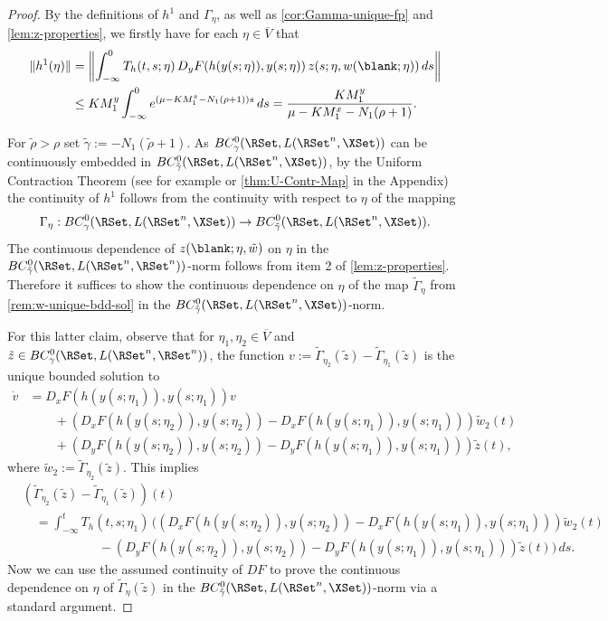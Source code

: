 \documentclass[a4paper]{siamart190516}
\begin{document}
 \begin{proof}
 By the definitions of $h^1$ and $\Gamma_{\eta}$, as well as
 \cref{cor:Gamma-unique-fp} and \cref{lem:z-properties}, we firstly have for each $\eta \in \overline{V}$ that
 \begin{align*}
 \| h^1(\eta) \| &= \left\| \int^0_{-\infty} T_h(t,s; \eta) \, D_yF(h(y(s;\eta)),y(s;\eta)) \, z(s; \eta, w(\blank; \eta)) \, ds \right\| \\
  &\leq K M^y_1 \int_{-\infty}^0 e^{(\mu-K M^x_1-N_1(\rho+1))s} \, ds =  \frac{K M^y_1}{\mu-K M^x_1-N_1(\rho+1)}.
 \end{align*}
 
For $\tilde{\rho} > \rho$ set $\tilde{\gamma} := -N_1(\tilde{\rho} + 1)$. As
$BC^0_{\gamma}(\RSet, L(\RSet^n,\XSet))$ can be continuously embedded in
$BC^0_{\tilde{\gamma}}(\RSet, L(\RSet^n,\XSet))$, by the Uniform Contraction Theorem
(see for example \cite{VaVG87} or \cref{thm:U-Contr-Map} in the Appendix) the continuity of $h^1$ follows from the continuity with respect to $\eta$ of the mapping
\[
\Gamma_{\eta}: BC^0_{\gamma}(\RSet, L(\RSet^n,\XSet)) \rightarrow BC^0_{\tilde{\gamma}}(\RSet, L(\RSet^n,\XSet)).
\]
The continuous dependence of $z(\blank; \eta, \tilde{w})$ on $\eta$ in the
$BC^0_{\tilde{\gamma}}(\RSet, L(\RSet^n,\RSet^n))$-norm follows from item 2 of
\cref{lem:z-properties}. Therefore it suffices to show the continuous dependence on
$\eta$ of the map $\tilde{\Gamma}_{\eta}$ from \cref{rem:w-unique-bdd-sol} in the $BC^0_{\tilde{\gamma}}(\RSet, L(\RSet^n,\XSet))$-norm. 

For this latter claim, observe that for $\eta_1, \eta_2 \in \overline{V}$ and $\tilde{z} \in BC_{\gamma}^{0}(\RSet, L(\RSet^n,\RSet^n))$, the function $v := \tilde{\Gamma}_{\eta_2} (\tilde{z}) - \tilde{\Gamma}_{\eta_1} (\tilde{z})$ is the unique bounded solution to
\begin{align*}
\dot{v} &= D_x F(h(y(s;\eta_1)),y(s;\eta_1)) v  \\
&\qquad +   \left( D_x F(h(y(s;\eta_2)),y(s;\eta_2)) - D_x F(h(y(s;\eta_1)),y(s;\eta_1)) \right) \tilde{w}_2(t) \\
&\qquad + \left( D_y F(h(y(s;\eta_2)),y(s;\eta_2)) - D_y F(h(y(s;\eta_1)),y(s;\eta_1)) \right) \tilde{z}(t),
\end{align*}
where $\tilde{w}_2 := \tilde{\Gamma}_{\eta_2}(\tilde{z})$. This implies
\begin{align*}
&\left(\tilde{\Gamma}_{\eta_2} (\tilde{z}) - \tilde{\Gamma}_{\eta_1} (\tilde{z}) \right)(t) \\
&\quad = \int^t_{-\infty} T_h(t,s;\eta_1) \, \Big(  \left( D_x F(h(y(s;\eta_2)),y(s;\eta_2)) - D_x F(h(y(s;\eta_1)),y(s;\eta_1)) \right) \tilde{w}_2(t) \\
&\qquad \qquad \qquad - \left( D_y F(h(y(s;\eta_2)),y(s;\eta_2)) - D_y F(h(y(s;\eta_1)),y(s;\eta_1)) \right) \tilde{z}(t) \Big)  \, ds.
\end{align*}
Now we can use the assumed continuity of $DF$ to prove the continuous dependence on $\eta$ of $\tilde{\Gamma}_{\eta}(\tilde{z})$ in the $BC^0_{\tilde{\gamma}}(\RSet, L(\RSet^n,\XSet))$-norm  via a standard argument. 
 \end{proof}
 
\end{document}
